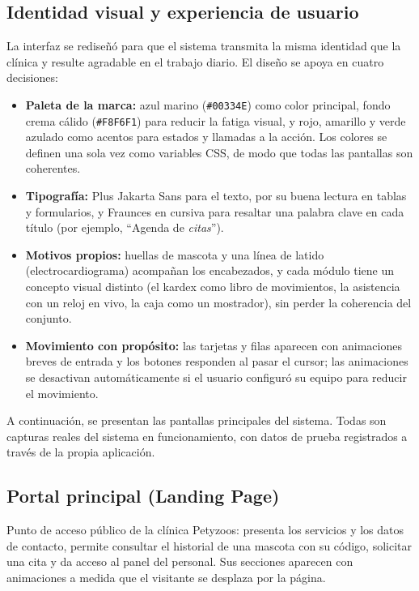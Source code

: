 \documentclass[11pt,a4paper]{report}
\begin{document}
\subsection{Identidad visual y experiencia de usuario}
La interfaz se rediseñó para que el sistema transmita la misma identidad que la clínica y resulte agradable en el trabajo diario. El diseño se apoya en cuatro decisiones:
\begin{itemize}
\item \textbf{Paleta de la marca:} azul marino (\texttt{\#00334E}) como color principal, fondo crema cálido (\texttt{\#F8F6F1}) para reducir la fatiga visual, y rojo, amarillo y verde azulado como acentos para estados y llamadas a la acción. Los colores se definen una sola vez como variables CSS, de modo que todas las pantallas son coherentes.
\item \textbf{Tipografía:} Plus Jakarta Sans para el texto, por su buena lectura en tablas y formularios, y Fraunces en cursiva para resaltar una palabra clave en cada título (por ejemplo, ``Agenda de \textit{citas}'').
\item \textbf{Motivos propios:} huellas de mascota y una línea de latido (electrocardiograma) acompañan los encabezados, y cada módulo tiene un concepto visual distinto (el kardex como libro de movimientos, la asistencia con un reloj en vivo, la caja como un mostrador), sin perder la coherencia del conjunto.
\item \textbf{Movimiento con propósito:} las tarjetas y filas aparecen con animaciones breves de entrada y los botones responden al pasar el cursor; las animaciones se desactivan automáticamente si el usuario configuró su equipo para reducir el movimiento.
\end{itemize}

A continuación, se presentan las pantallas principales del sistema. Todas son capturas reales del sistema en funcionamiento, con datos de prueba registrados a través de la propia aplicación.

\subsection{Portal principal (Landing Page)}
Punto de acceso público de la clínica Petyzoos: presenta los servicios y los datos de contacto, permite consultar el historial de una mascota con su código, solicitar una cita y da acceso al panel del personal. Sus secciones aparecen con animaciones a medida que el visitante se desplaza por la página.
\end{document}
